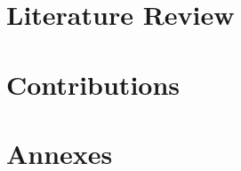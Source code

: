 \documentclass[frenchb,10pt, a4paper]{report}
\begin{document}
\pagestyle{plain}
\pagedegarde
\dominitoc
\tableofcontents*




\part{Literature Review}




\part{Contributions}








\part*{Annexes}

\nocite{*}


%
\end{document}
